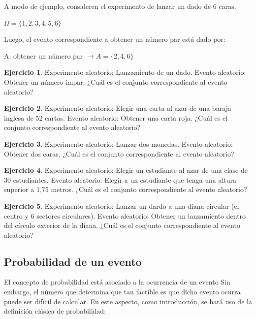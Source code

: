 \documentclass[
  11pt,
]{book}
\theoremstyle{definition}
\theoremstyle{definition}
\theoremstyle{definition}
\newtheorem{exercise}{Ejercicio}[chapter]
\theoremstyle{definition}
\theoremstyle{remark}
\begin{document}
A modo de ejemplo, consideren el experimento de lanzar un dado de 6 caras.

\(\Omega = \lbrace 1,2,3,4,5,6 \rbrace\)

Luego, el evento correspondiente a obtener un número par está dado por:

A: obtener un número par \(\rightarrow A = \lbrace 2,4,6 \rbrace\)

\begin{exercise}
Experimento aleatorio: Lanzamiento de un dado. Evento aleatorio: Obtener un número impar. ¿Cuál es el conjunto correspondiente al evento aleatorio?
\end{exercise}

\begin{exercise}
Experimento aleatorio: Elegir una carta al azar de una baraja inglesa de 52 cartas. Evento aleatorio: Obtener una carta roja. ¿Cuál es el conjunto correspondiente al evento aleatorio?
\end{exercise}

\begin{exercise}
Experimento aleatorio: Lanzar dos monedas. Evento aleatorio: Obtener dos caras. ¿Cuál es el conjunto correspondiente al evento aleatorio?
\end{exercise}

\begin{exercise}
Experimento aleatorio: Elegir un estudiante al azar de una clase de 30 estudiantes. Evento aleatorio: Elegir a un estudiante que tenga una altura superior a 1,75 metros. ¿Cuál es el conjunto correspondiente al evento aleatorio?
\end{exercise}

\begin{exercise}
Experimento aleatorio: Lanzar un dardo a una diana circular (el centro y 6 sectores circulares). Evento aleatorio: Obtener un lanzamiento dentro del círculo exterior de la diana. ¿Cuál es el conjunto correspondiente al evento aleatorio?
\end{exercise}

\subsection{Probabilidad de un evento}\label{probabilidad-evento}

El concepto de probabilidad está asociado a la ocurrencia de un evento Sin embargo, el número que determina que tan factible es que dicho evento ocurra puede ser difícil de calcular. En este aspecto, como introducción, se hará uso de la definición clásica de probabilidad:
\end{document}

